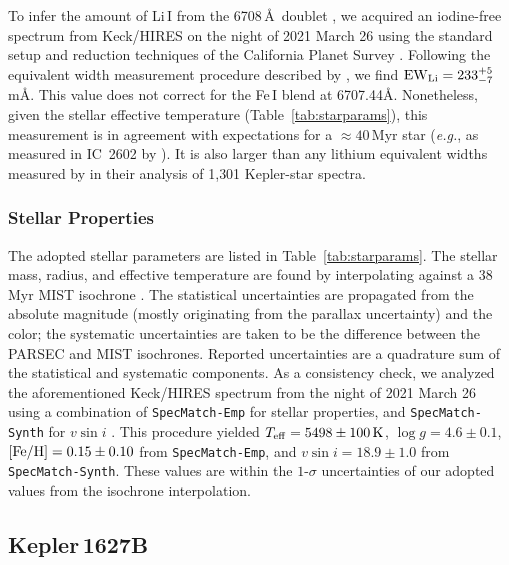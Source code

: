 \documentclass[12pt,modern,twocolumn,tighten,linenumbers,trackchanges]{aastex63}
\begin{document}
To infer the amount of Li\,\textsc{I} from the 6708\,\AA\ doublet
\citep[{\it e.g.},][]{soderblom_ages_2014}, we acquired an iodine-free
spectrum from Keck/HIRES on the night of 2021 March 26 using the
standard setup and reduction techniques of the California Planet
Survey \citep{howard_cps_2010}.  Following the equivalent width
measurement procedure described by \citet{bouma_2021_ngc2516}, we find
${\rm EW}_{\rm Li} = 233^{+5}_{-7}$\,m\AA.   This value does not
correct for the Fe\,\textsc{I} blend at 6707.44\AA.  Nonetheless,
given the stellar effective temperature (Table~\ref{tab:starparams}),
this measurement is in agreement with expectations for a
$\approx40$\,Myr star ({\it e.g.}, as measured in IC~2602 by
\citealt{randich_gaiaeso_2018}).  It is also larger than any lithium
equivalent widths measured by \citet{berger_identifying_2018} in their
analysis of 1{,}301 Kepler-star spectra.


\subsubsection{Stellar Properties}

The adopted stellar parameters are listed in
Table~\ref{tab:starparams}.  The stellar mass, radius, and effective
temperature are found by interpolating against a 38$\,$Myr MIST
isochrone \citep{choi_mesa_2016}.  The statistical uncertainties are
propagated from the absolute magnitude (mostly originating from the
parallax uncertainty) and the color; the systematic uncertainties are
taken to be the difference between the PARSEC
\citep{bressan_parsec_2012} and MIST isochrones.  Reported
uncertainties are a quadrature sum of the statistical and systematic
components.  As a consistency check, we analyzed the aforementioned
Keck/HIRES spectrum from the night of 2021 March 26 using a
combination of \texttt{SpecMatch-Emp} for stellar properties, and
\texttt{SpecMatch-Synth} for $v\sin i$ \citep{yee_SM_2017}.  This
procedure yielded $T_{\rm eff}=5498\pm100\,{\rm K}$, $\log
g=4.6\pm0.1$, $[{\rm Fe/H}]=0.15\pm0.10$ from \texttt{SpecMatch-Emp},
and $v\sin i = 18.9\pm1.0$ from \texttt{SpecMatch-Synth}.  These
values are within the $1$-$\sigma$ uncertainties of our adopted values
from the isochrone interpolation.


\subsection{Kepler\,1627B}
\end{document}
